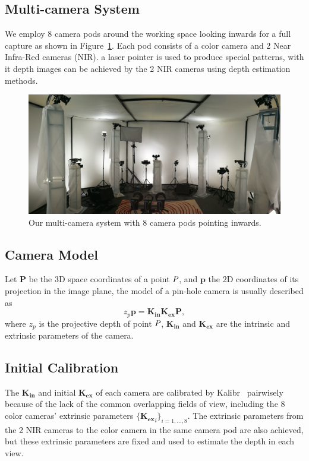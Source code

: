 \documentclass{article}
\begin{document}
\subsection{Multi-camera System}

We employ 8 camera pods around the working space looking inwards for a full capture as shown in Figure~\ref{fig:rig}. Each pod consists of a color camera and 2 Near Infra-Red cameras (NIR). a laser pointer is used to produce special patterns, with it depth images can be achieved by the 2 NIR cameras using depth estimation methods.

\begin{figure}[h]
\centering
\includegraphics[scale=0.066]{rig.jpg}
\caption{Our multi-camera system with 8 camera pods pointing inwards.}
\label{fig:rig}
\end{figure}
\subsection{Camera Model}
Let $\mathbf{P}$ be the 3D space coordinates of a point $\emph{P}$, and $\mathbf{p}$ the 2D coordinates of its projection in the image plane, the model of a pin-hole camera is usually described as
\begin{equation}
z_{p}\mathbf{p}=\mathbf{K_{in}}\mathbf{K_{ex}}\mathbf{P},
\end{equation}
where $z_{p}$ is the projective depth of point $\emph{P}$, $\mathbf{K_{in}}$ and $\mathbf{K_{ex}}$ are the intrinsic and extrinsic parameters of the camera.
\subsection{Initial Calibration}
The $\mathbf{K_{in}}$ and initial $\mathbf{K_{ex}}$ of each camera are calibrated by Kalibr~\cite{Maye2013Self} pairwisely because of the lack of the common overlapping fields of view, including the 8 color cameras' extrinsic parameters $\{\mathbf{K_{ex}}_{i}\}_{i=1,...,8}$. The extrinsic parameters from the 2 NIR cameras to the color camera in the same camera pod are also achieved, but these extrinsic parameters are fixed and used to estimate the depth in each view.
\end{document}
